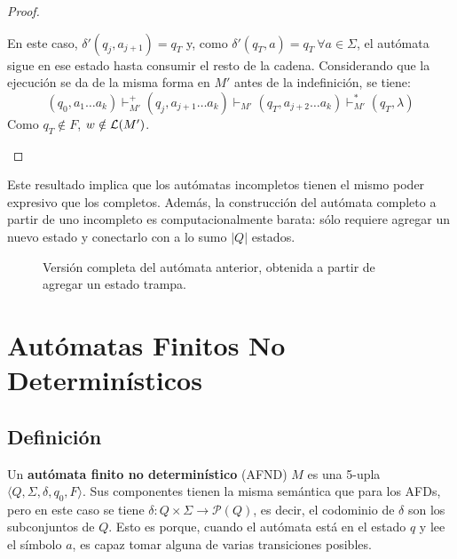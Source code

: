 \begin{proof}
\begin{itemize}
        En este caso, $\delta' (q_j, a_{j+1}) = q_T$ y, como $\delta'(q_T, a) = q_T\ \forall a \in \Sigma$, el autómata sigue en ese estado hasta consumir el resto de la cadena. Considerando que la ejecución se da de la misma forma en $M'$ antes de la indefinición, se tiene:
        $$(q_0, a_1 \dots a_k) \vdash_{M'}^+ (q_j, a_{j+1} \dots a_k) \vdash_{M'} (q_T, a_{j+2} \dots a_k) \vdash_{M'}^* (q_T, \lambda)$$
        Como $q_T \notin F$, $w \notin \mathcal{L}(M')$.
    \end{itemize}
\end{proof}

Este resultado implica que los autómatas incompletos tienen el mismo poder expresivo que los completos. Además, la construcción del autómata completo a partir de uno incompleto es computacionalmente barata: sólo requiere agregar un nuevo estado y conectarlo con a lo sumo $|Q|$ estados.

\begin{figure}[H]
    \centering
    \caption*{Versión completa del autómata anterior, obtenida a partir de agregar un estado trampa.}
\end{figure}

\section{Autómatas Finitos No Determinísticos}

\subsection{Definición}

Un \textbf{autómata finito no determinístico} (AFND) $M$ es una 5-upla $\langle Q, \Sigma, \delta, q_0, F \rangle$. Sus componentes tienen la misma semántica que para los AFDs, pero en este caso se tiene $\delta : Q \times \Sigma \to \mathcal P (Q)$, es decir, el codominio de $\delta$ son los subconjuntos de $Q$. Esto es porque, cuando el autómata está en el estado $q$ y lee el símbolo $a$, es capaz tomar alguna de varias transiciones posibles.

